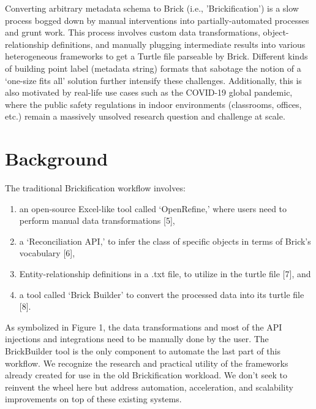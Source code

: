 \documentclass[twocolumn, switch]{article} %
\begin{document}
Converting arbitrary metadata schema to Brick (i.e., 'Brickification') is a slow process bogged down by manual interventions into partially-automated processes and grunt work. This process involves custom data transformations, object-relationship definitions, and manually plugging intermediate results into various heterogeneous frameworks to get a Turtle file parseable by Brick. Different kinds of building point label (metadata string) formats that sabotage the notion of a ‘one-size fits all’ solution further intensify these challenges.  Additionally, this is also motivated by real-life use cases such as the COVID-19 global pandemic, where the public safety regulations in indoor environments (classrooms, offices, etc.) remain a massively unsolved research question and challenge at scale.


\section{Background}
The traditional Brickification workflow involves:
\begin{enumerate}
    \item an open-source Excel-like tool called ‘OpenRefine,’ where users need to perform manual data transformations [5],
    \item a ‘Reconciliation API,’ to infer the class of specific objects in terms of Brick’s vocabulary [6],
    \item Entity-relationship definitions in a .txt file, to utilize in the turtle file [7], and
    \item a tool called ‘Brick Builder’ to convert the processed data into its turtle file [8].
\end{enumerate}
As symbolized in Figure 1, the data transformations and most of the API injections and integrations need to be manually done by the user. The BrickBuilder tool is the only component to automate the last part of this workflow. We recognize the research and practical utility of the frameworks already created for use in the old Brickification workload. We don’t seek to reinvent the wheel here but address automation, acceleration, and scalability improvements on top of these existing systems.
\end{document}
